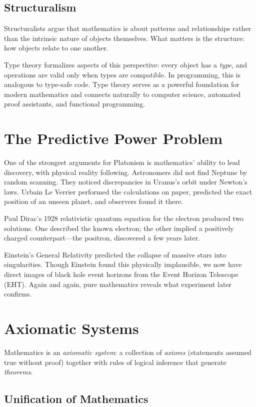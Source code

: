 \subsection*{Structuralism}

Structuralists argue that mathematics is about patterns and relationships rather than the intrinsic nature of objects themselves.
What matters is the structure: how objects relate to one another.

Type theory formalizes aspects of this perspective: every object has a \emph{type}, and operations are valid only when types are compatible.
In programming, this is analogous to type-safe code.
Type theory serves as a powerful foundation for modern mathematics and connects naturally to computer science, automated proof assistants, and functional programming.

\section{The Predictive Power Problem}

One of the strongest arguments for Platonism is mathematics' ability to lead discovery, with physical reality following.
Astronomers did not find Neptune by random scanning.
They noticed discrepancies in Uranus's orbit under Newton's laws.
Urbain Le Verrier performed the calculations on paper, predicted the exact position of an unseen planet, and observers found it there.

Paul Dirac's 1928 relativistic quantum equation for the electron produced two solutions.
One described the known electron; the other implied a positively charged counterpart---the positron, discovered a few years later.

Einstein's General Relativity predicted the collapse of massive stars into singularities.
Though Einstein found this physically implausible, we now have direct images of black hole event horizons from the Event Horizon Telescope (EHT).
Again and again, pure mathematics reveals what experiment later confirms.

\section{Axiomatic Systems}

Mathematics is an \emph{axiomatic system}: a collection of \emph{axioms} (statements assumed true without proof) together with rules of logical inference that generate \emph{theorems}.

\subsection*{Unification of Mathematics}

